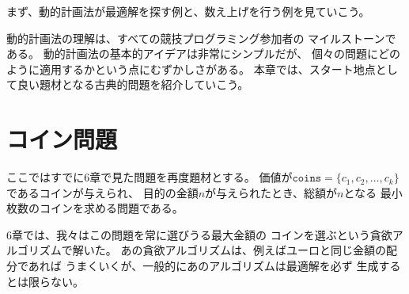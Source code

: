まず、動的計画法が最適解を探す例と、数え上げを行う例を見ていこう。

動的計画法の理解は、すべての競技プログラミング参加者の
マイルストーンである。
動的計画法の基本的アイデアは非常にシンプルだが、
個々の問題にどのように適用するかという点にむずかしさがある。
本章では、スタート地点として良い題材となる古典的問題を紹介していこう。

\begin{comment}
\section{Coin problem}

We first focus on a problem that we
have already seen in Chapter 6:
Given a set of coin values $\texttt{coins} = \{c_1,c_2,\ldots,c_k\}$
and a target sum of money $n$, our task is to
form the sum $n$ using as few coins as possible.

In Chapter 6, we solved the problem using a
greedy algorithm that always chooses the largest
possible coin.
The greedy algorithm works, for example,
when the coins are the euro coins,
but in the general case the greedy algorithm
does not necessarily produce an optimal solution.
\end{comment}

\section{コイン問題}

ここではすでに6章で見た問題を再度題材とする。
価値が$\texttt{coins} = \{c_1,c_2,\ldots,c_k\}$であるコインが与えられ、
目的の金額$n$が与えられたとき、総額が$n$となる
最小枚数のコインを求める問題である。

6章では、我々はこの問題を常に選びうる最大金額の
コインを選ぶという貪欲アルゴリズムで解いた。
あの貪欲アルゴリズムは、例えばユーロと同じ金額の配分であれば
うまくいくが、一般的にあのアルゴリズムは最適解を必ず
生成するとは限らない。

\begin{comment}
Now is time to solve the problem efficiently
using dynamic programming, so that the algorithm
works for any coin set.
The dynamic programming
algorithm is based on a recursive function
that goes through all possibilities how to
form the sum, like a brute force algorithm.
However, the dynamic programming
algorithm is efficient because
it uses \emph{memoization} and
calculates the answer to each subproblem only once.
\end{comment}

